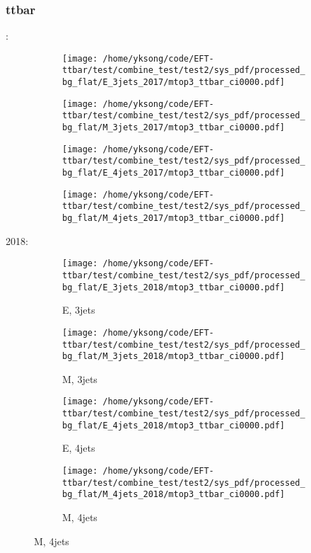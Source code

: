 \documentclass{beamer}
\begin{document}
\begin{frame}
\frametitle{ttbar}
\fontsize{5}{1}:
\begin{figure}
\centering
\begin{subfigure}[b]{0.24\textwidth}
\texttt{[image: /home/yksong/code/EFT-ttbar/test/combine\_test/test2/sys\_pdf/processed\_bg\_flat/E\_3jets\_2017/mtop3\_ttbar\_ci0000.pdf]}
\end{subfigure}
\begin{subfigure}[b]{0.24\textwidth}
\texttt{[image: /home/yksong/code/EFT-ttbar/test/combine\_test/test2/sys\_pdf/processed\_bg\_flat/M\_3jets\_2017/mtop3\_ttbar\_ci0000.pdf]}
\end{subfigure}
\begin{subfigure}[b]{0.24\textwidth}
\texttt{[image: /home/yksong/code/EFT-ttbar/test/combine\_test/test2/sys\_pdf/processed\_bg\_flat/E\_4jets\_2017/mtop3\_ttbar\_ci0000.pdf]}
\end{subfigure}
\begin{subfigure}[b]{0.24\textwidth}
\texttt{[image: /home/yksong/code/EFT-ttbar/test/combine\_test/test2/sys\_pdf/processed\_bg\_flat/M\_4jets\_2017/mtop3\_ttbar\_ci0000.pdf]}
\end{subfigure}
\end{figure}
2018:
\begin{figure}
\centering
\begin{subfigure}[b]{0.24\textwidth}
\texttt{[image: /home/yksong/code/EFT-ttbar/test/combine\_test/test2/sys\_pdf/processed\_bg\_flat/E\_3jets\_2018/mtop3\_ttbar\_ci0000.pdf]}
\captionsetup{font=tiny}
\caption{E, 3jets}
\end{subfigure}
\begin{subfigure}[b]{0.24\textwidth}
\texttt{[image: /home/yksong/code/EFT-ttbar/test/combine\_test/test2/sys\_pdf/processed\_bg\_flat/M\_3jets\_2018/mtop3\_ttbar\_ci0000.pdf]}
\captionsetup{font=tiny}
\caption{M, 3jets}
\end{subfigure}
\begin{subfigure}[b]{0.24\textwidth}
\texttt{[image: /home/yksong/code/EFT-ttbar/test/combine\_test/test2/sys\_pdf/processed\_bg\_flat/E\_4jets\_2018/mtop3\_ttbar\_ci0000.pdf]}
\captionsetup{font=tiny}
\caption{E, 4jets}
\end{subfigure}
\begin{subfigure}[b]{0.24\textwidth}
\texttt{[image: /home/yksong/code/EFT-ttbar/test/combine\_test/test2/sys\_pdf/processed\_bg\_flat/M\_4jets\_2018/mtop3\_ttbar\_ci0000.pdf]}
\captionsetup{font=tiny}
\caption{M, 4jets}
\end{subfigure}
\end{figure}
\end{frame}
\end{document}
